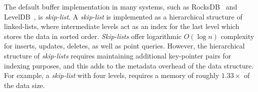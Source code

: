 
The default buffer implementation in many systems, such as RocksDB~\cite{Facebook2021} and LevelDB~\cite{GoogleLevelDB}, is \textit{skip-list}. 
A \textit{skip-list} is implemented as a hierarchical structure of linked-lists, where intermediate levels act as an index for the last level which stores the data in sorted order. 
\textit{Skip-lists} offer logarithmic $O(\log n)$ complexity for inserts, updates, deletes, as well as point queries. 
However, the hierarchical structure of \textit{skip-lists} requires maintaining additional key-pointer pairs for indexing purposes, and this adds to the metadata overhead of the data structure. 
For example, a \textit{skip-list} with four levels, requires a memory of roughly $1.33\times$ of the data size. 

